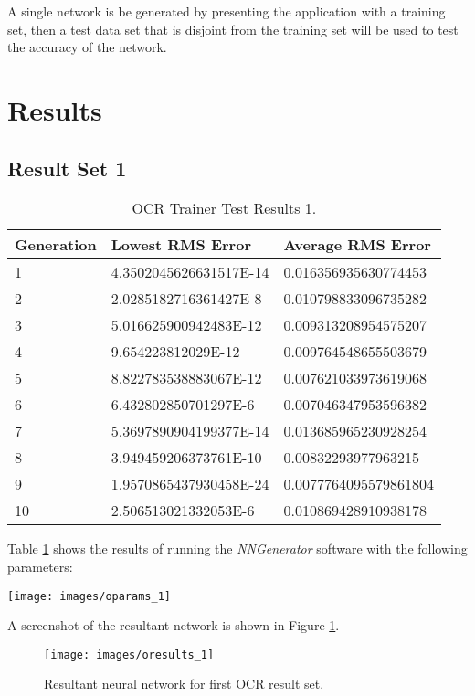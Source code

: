 A single network is be generated by presenting the application with a training set, then a test data set that is disjoint from the training set will be used to test the accuracy of the network.


\section{Results}  
\subsection{Result Set 1}

\begin{center}
    \begin{longtable}{ | l | l | l |}
      \caption{OCR Trainer Test Results 1.} \label{ocr1} \\
    \hline
  Generation & Lowest RMS Error & Average RMS Error \\ \hline
1 &	4.3502045626631517E-14 &	0.016356935630774453 \\ \hline
2 &	2.0285182716361427E-8 &	0.010798833096735282 \\ \hline
3 &	5.016625900942483E-12 &	0.009313208954575207 \\ \hline
4 &	9.654223812029E-12 &	0.009764548655503679 \\ \hline
5 &	8.822783538883067E-12 &	0.007621033973619068 \\ \hline
6 &	6.432802850701297E-6 &	0.007046347953596382 \\ \hline
7 &	5.3697890904199377E-14 &	0.013685965230928254 \\ \hline
8 &	3.949459206373761E-10 &	0.00832293977963215 \\ \hline
9 &	1.9570865437930458E-24 &	0.0077764095579861804 \\ \hline
10 &	2.506513021332053E-6 &	0.010869428910938178 \\ \hline
\end{longtable}
\end{center}

Table \ref{ocr1} shows the results of running the {\it NNGenerator} software with the following parameters:

\begin{center}
\texttt{[image: images/oparams\_1]}
\end{center}

A screenshot of the resultant network is shown in Figure \ref{oresults_1}.

\begin{figure}[hbt!]
  \centering
  \texttt{[image: images/oresults\_1]}
  \caption{Resultant neural network for first OCR result set.}
  \label{oresults_1}
\end{figure}

